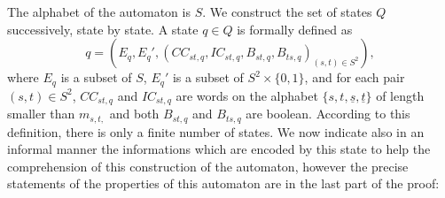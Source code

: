 \documentclass[reqno,12pt]{amsart}
\theoremstyle{definition}
\begin{document}
 
The alphabet of the automaton is $S$.  We construct the set of states $Q$ successively, state by state. A state  $q \in Q$ is formally defined as \begin{equation*}
q=(E_q, E_q', (CC_{st,q},IC_{st,q}, B_{st,q}, B_{ts,q})_{(s,t) \in S^2}),
\end{equation*}
where $E_q$ is a subset of $S$, $E_q'$ is a subset of $S^2 \times \{0,1\}$, and for each pair $(s,t) \in S^2$, $CC_{st,q}$ and $IC_{st,q}$ are words on the alphabet $\{s,t, \underline{s}, \underline{t}\}$ of length smaller than $m_{s,t,}$ and both $B_{st,q}$ and $B_{ts,q}$ are boolean. According to this definition, there is only a finite number of states. We now indicate also in an informal manner the informations which are encoded by this state to help the comprehension of this construction of the automaton, however the precise statements of the properties of this automaton are in the last part of the proof:
\end{document}
